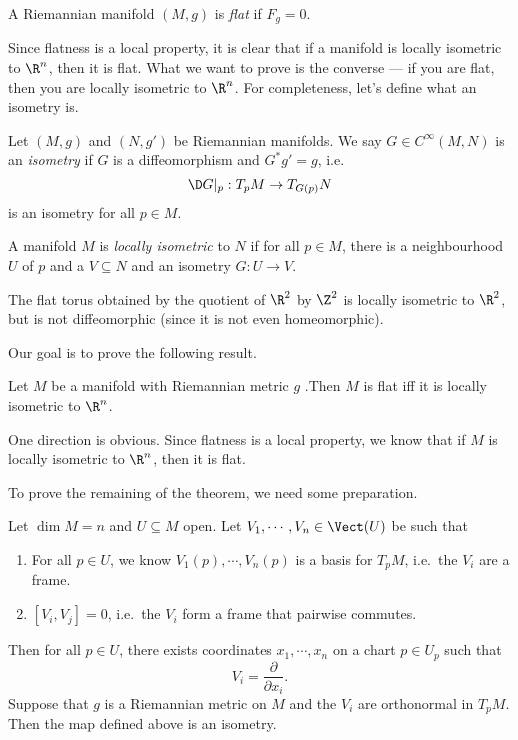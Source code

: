 \documentclass[a4paper]{article}
\begin{document}
\begin{defi}
  A Riemannian manifold $(M, g)$ is \emph{flat} if $F_g = 0$.
\end{defi}

Since flatness is a local property, it is clear that if a manifold is locally isometric to $\R^n$, then it is flat. What we want to prove is the converse --- if you are flat, then you are locally isometric to $\R^n$. For completeness, let's define what an isometry is.

\begin{defi}[Isometry]
  Let $(M, g)$ and $(N, g')$ be Riemannian manifolds. We say $G \in C^\infty(M, N)$ is an \emph{isometry} if $G$ is a diffeomorphism and $G^* g' = g$, i.e.
  \[
    \D G|_p: T_p M \to T_{G(p)} N
  \]
  is an isometry for all $p \in M$.
\end{defi}

\begin{defi}
  A manifold $M$ is \emph{locally isometric} to $N$ if for all $p \in M$, there is a neighbourhood $U$ of $p$ and a $V \subseteq N$ and an isometry $G: U \to V$.
\end{defi}

\begin{eg}
  The flat torus obtained by the quotient of $\R^2$ by $\Z^2$ is locally isometric to $\R^2$, but is not diffeomorphic (since it is not even homeomorphic).
\end{eg}

Our goal is to prove the following result.
\begin{thm}
  Let $M$ be a manifold with Riemannian metric $g$ .Then $M$ is flat iff it is locally isometric to $\R^n$.
\end{thm}

One direction is obvious. Since flatness is a local property, we know that if $M$ is locally isometric to $\R^n$, then it is flat.

To prove the remaining of the theorem, we need some preparation.
\begin{prop}
  Let $\dim M = n$ and $U \subseteq M$ open. Let $V_1, \cdots, V_n \in \Vect(U)$ be such that
  \begin{enumerate}
    \item For all $p \in U$, we know $V_1(p), \cdots, V_n(p)$ is a basis for $T_pM$, i.e.\ the $V_i$ are a frame.
    \item $[V_i, V_j] = 0$, i.e.\ the $V_i$ form a frame that pairwise commutes.
  \end{enumerate}
  Then for all $p \in U$, there exists coordinates $x_1, \cdots, x_n$ on a chart $p \in U_p$ such that
  \[
    V_i = \frac{\partial}{\partial x_i}.
  \]
  Suppose that $g$ is a Riemannian metric on $M$ and the $V_i$ are orthonormal in $T_pM$. Then the map defined above is an isometry.
\end{prop}
\end{document}
